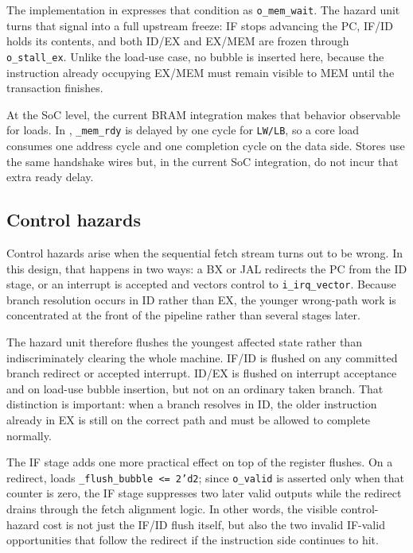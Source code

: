 \documentclass[11pt,a4paper]{article}
\begin{document}
The implementation in  expresses that condition as \texttt{o\_mem\_wait}. The hazard unit turns that signal into a full upstream freeze: IF stops advancing the PC, IF/ID holds its contents, and both ID/EX and EX/MEM are frozen through \texttt{o\_stall\_ex}. Unlike the load-use case, no bubble is inserted here, because the instruction already occupying EX/MEM must remain visible to MEM until the transaction finishes.

At the SoC level, the current BRAM integration makes that behavior observable for loads. In , \texttt{\_mem\_rdy} is delayed by one cycle for \texttt{LW/LB}, so a core load consumes one address cycle and one completion cycle on the data side. Stores use the same handshake wires but, in the current SoC integration, do not incur that extra ready delay.

\subsection{Control hazards}

Control hazards arise when the sequential fetch stream turns out to be wrong. In this design, that happens in two ways: a BX or JAL redirects the PC from the ID stage, or an interrupt is accepted and vectors control to \texttt{i\_irq\_vector}. Because branch resolution occurs in ID rather than EX, the younger wrong-path work is concentrated at the front of the pipeline rather than several stages later.

The hazard unit therefore flushes the youngest affected state rather than indiscriminately clearing the whole machine. IF/ID is flushed on any committed branch redirect or accepted interrupt. ID/EX is flushed on interrupt acceptance and on load-use bubble insertion, but not on an ordinary taken branch. That distinction is important: when a branch resolves in ID, the older instruction already in EX is still on the correct path and must be allowed to complete normally.

The IF stage adds one more practical effect on top of the register flushes. On a redirect,  loads \texttt{\_flush\_bubble <= 2'd2}; since \texttt{o\_valid} is asserted only when that counter is zero, the IF stage suppresses two later valid outputs while the redirect drains through the fetch alignment logic. In other words, the visible control-hazard cost is not just the IF/ID flush itself, but also the two invalid IF-valid opportunities that follow the redirect if the instruction side continues to hit.
\end{document}
